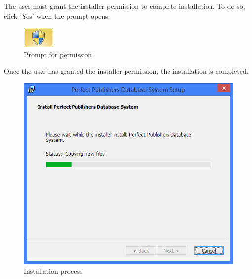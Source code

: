 The user must grant the installer permission to complete installation. To do so, click 'Yes' when the prompt opens.

\begin{figure}[H]
    \includegraphics[width=\textwidth]{./Manual/Installation/Permission.png}
    \caption{Prompt for permission}
\end{figure}

Once the user has granted the installer permission, the installation is completed.

\begin{figure}[H]
    \includegraphics[width=\textwidth]{./Manual/Installation/Installing.png}
    \caption{Installation process}
\end{figure}

